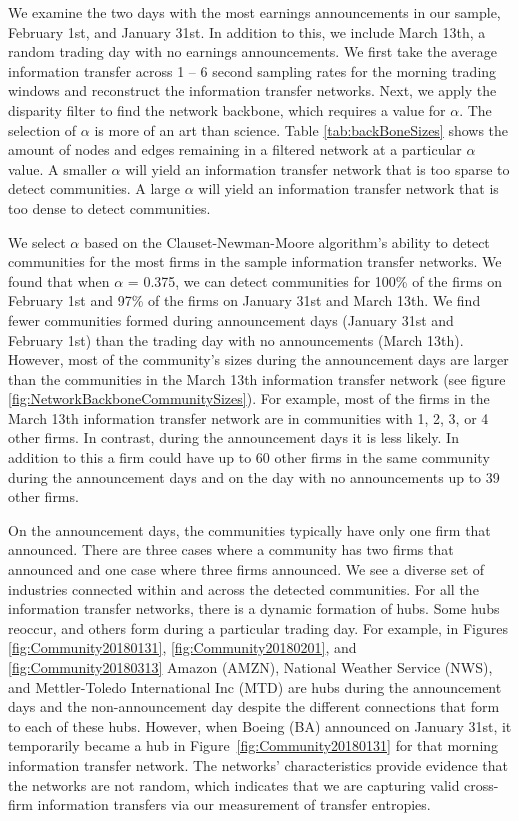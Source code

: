 We examine the two days with the most earnings announcements in our sample,  February 1st, and January 31st. In addition to this,  we include March 13th,  a random trading day with no earnings  announcements.  We first take the average information transfer across 1 – 6 second sampling rates for the morning trading windows and reconstruct the information transfer networks.  Next, we apply the disparity filter to find the network backbone, which requires a value for \(\alpha\). The selection of \(\alpha\) is more of an art than science.  Table \ref{tab:backBoneSizes} shows the amount of nodes and edges remaining in a filtered network at a particular  \(\alpha\) value.  A smaller \(\alpha\) will yield an information transfer network that is too sparse to detect communities. A large \(\alpha\) will yield an information transfer network that is too dense to detect communities. 

We select \(\alpha\) based on the Clauset-Newman-Moore algorithm’s ability to detect communities for the most firms in the sample information transfer networks.  We found that when \(\alpha\) = 0.375,  we can detect communities for 100\% of the firms on February 1st and 97\% of the firms on January 31st and March 13th.  We find fewer communities formed during announcement days (January 31st and February 1st) than the trading day with no announcements (March 13th).  However,  most of the community’s sizes during the announcement days are larger than the communities in the March 13th information transfer network (see figure \ref{fig:NetworkBackboneCommunitySizes}).  For example,  most of the firms in the March 13th information transfer network are in communities with 1, 2, 3, or 4 other firms.  In contrast, during the announcement days it is less likely.  In addition to this a firm could have up to 60 other firms in the same community during the announcement days and on the day with no announcements up to 39 other firms.

On the announcement days, the communities typically have only one firm that announced.  There are three cases where a community has two firms that announced and one case where three firms announced. We see a diverse set of industries connected within and across the detected communities.  For all the information transfer networks, there is a dynamic formation of hubs.  Some hubs reoccur, and others form during a particular trading day.  For example,  in Figures \ref{fig:Community20180131},  \ref{fig:Community20180201}, and \ref{fig:Community20180313} Amazon (AMZN), National Weather Service (NWS), and Mettler-Toledo International Inc (MTD) are hubs during the announcement days and the non-announcement day despite the different connections that form to each of these hubs.  However, when Boeing (BA) announced on January 31st, it temporarily became a hub in Figure~\ref{fig:Community20180131} for that morning information transfer network. The networks' characteristics provide evidence that the networks are not random, which indicates that we are capturing valid cross-firm information transfers via our measurement of transfer entropies. 


